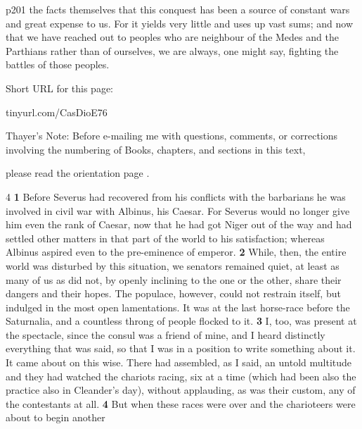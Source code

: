 p201 the facts themselves that this conquest has been a source of constant wars and great expense to us. For it yields very little and uses up vast sums; and now that we have reached out to peoples who are neighbour of the Medes and the Parthians rather than of ourselves, we are always, one might say, fighting the battles of those peoples.


Short URL for this page:

tinyurl.com/CasDioE76

Thayer's Note: Before e-mailing me with questions, comments, or corrections involving the numbering of Books, chapters, and sections in this text,

please read the orientation page .

4 \textbf{1} Before Severus had recovered from his conflicts with the barbarians he was involved in civil war with Albinus, his Caesar. For Severus would no longer give him even the rank of Caesar, now that he had got Niger out of the way and had settled other matters in that part of the world to his satisfaction; whereas Albinus aspired even to the pre-eminence of emperor. \textbf{2} While, then, the entire world was disturbed by this situation, we senators remained quiet, at least as many of us as did not, by openly inclining to the one or the other, share their dangers and their hopes. The populace, however, could not restrain itself, but indulged in the most open lamentations. It was at the last horse-race before the Saturnalia, and a countless throng of people flocked to it. \textbf{3} I, too, was present at the spectacle, since the consul was a friend of mine, and I heard distinctly everything that was said, so that I was in a position to write something about it. It came about on this wise. There had assembled, as I said, an untold multitude and they had watched the chariots ra­cing, six at a time (which had been also the practice also in Cleander's day), without applauding, as was their custom, any of the contestants at all. \textbf{4} But when these races were over and the charioteers were about to begin another

